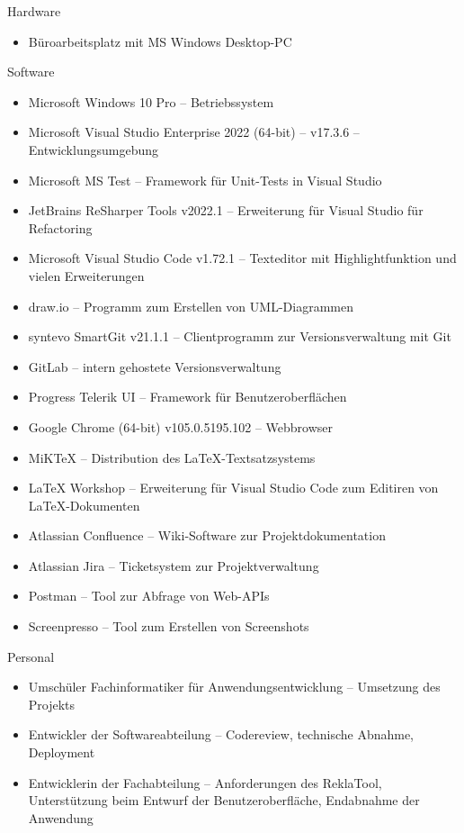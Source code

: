 Hardware
\begin{itemize}
    \item Büroarbeitsplatz mit MS Windows Desktop-PC
\end{itemize}
Software
\begin{itemize}
    \item Microsoft Windows 10 Pro -- Betriebssystem
    \item Microsoft Visual Studio Enterprise 2022 (64-bit) -- v17.3.6 -- Entwicklungsumgebung
    \item Microsoft MS Test -- Framework für Unit-Tests in Visual Studio
    \item JetBrains ReSharper Tools v2022.1 -- Erweiterung für Visual Studio für \ua Refactoring
    \item Microsoft Visual Studio Code v1.72.1 -- Texteditor mit Highlightfunktion und vielen Erweiterungen
    \item draw.io -- Programm zum Erstellen von UML-Diagrammen
    \item syntevo SmartGit v21.1.1 -- Clientprogramm zur Versionsverwaltung mit Git
    \item GitLab -- intern gehostete Versionsverwaltung
    \item Progress Telerik UI -- Framework für Benutzeroberflächen
    \item Google Chrome (64-bit) v105.0.5195.102 -- Webbrowser
    \item MiKTeX -- Distribution des LaTeX-Textsatzsystems
    \item LaTeX Workshop -- Erweiterung für Visual Studio Code zum Editiren von LaTeX-Dokumenten
    \item Atlassian Confluence -- Wiki-Software zur Projektdokumentation
    \item Atlassian Jira -- Ticketsystem zur Projektverwaltung
    \item Postman -- Tool zur Abfrage von Web-APIs
    \item Screenpresso -- Tool zum Erstellen von Screenshots
\end{itemize}
Personal
\begin{itemize}
    \item Umschüler Fachinformatiker für Anwendungsentwicklung -- Umsetzung des Projekts
    \item Entwickler der Softwareabteilung  -- Codereview, technische Abnahme, Deployment
    \item Entwicklerin der Fachabteilung -- Anforderungen des ReklaTool, Unterstützung beim Entwurf der Benutzeroberfläche,
    Endabnahme der Anwendung
\end{itemize}